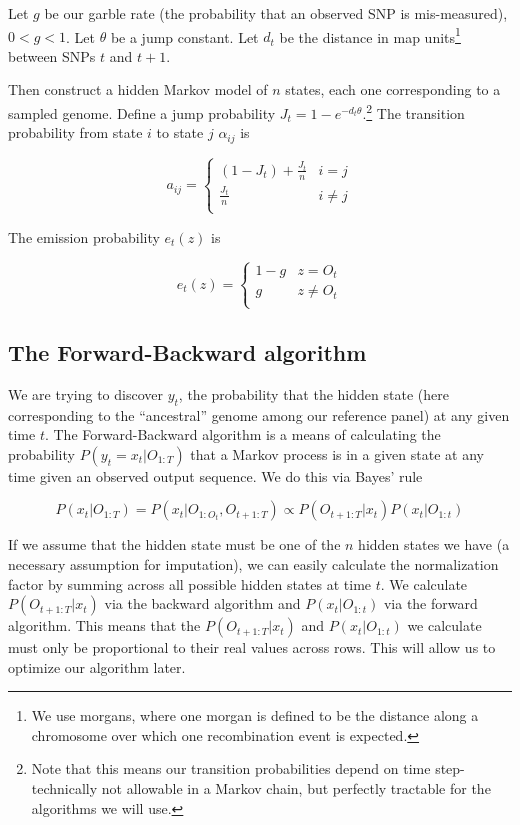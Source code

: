 \documentclass[12pt]{article}
\begin{document}
Let $g$ be our garble rate (the probability that an observed SNP is mis-measured), $0 < g < 1$.  Let $\theta$ be a jump constant.  Let $d_t$ be the distance in map units\footnote{We use morgans, where one morgan is defined to be the distance along a chromosome over which one recombination event is expected.} between SNPs $t$ and $t+1$.

Then construct a hidden Markov model of $n$ states, each one corresponding to a sampled genome.  Define a jump probability $J_t = 1 - e^{-d_t\theta}$.\footnote{Note that this means our transition probabilities depend on time step- technically not allowable in a Markov chain, but perfectly tractable for the algorithms we will use.}  The transition probability from state $i$ to state $j$ $\alpha_{ij}$ is

\[ a_{ij} = \begin{cases} 
      (1 - J_t) + \frac{J_t}{n} & i = j \\
      \frac{J_t}{n} & i \neq j \\
   \end{cases}
\]

The emission probability $e_t(z)$ is

\[ e_t(z) = \begin{cases} 
      1-g & z = O_t \\
      g & z \neq O_t \\
   \end{cases}
\]

\subsection{The Forward-Backward algorithm}

We are trying to discover $y_t$, the probability that the hidden state (here corresponding to the ``ancestral'' genome among our reference panel) at any given time $t$.  The Forward-Backward algorithm is a means of calculating the probability $P(y_t = x_t | O_{1:T})$ that a Markov process is in a given state at any time given an observed output sequence.  We do this via Bayes' rule

$$ P(x_t | O_{1:T}) = P(x_t | O_{1:O_t}, O_{t+1:T}) \propto P(O_{t+1:T} | x_t) P(x_t | O_{1:t}) $$

If we assume that the hidden state must be one of the $n$ hidden states we have (a necessary assumption for imputation), we can easily calculate the normalization factor by summing across all possible hidden states at time $t$.  We calculate $P(O_{t+1:T} | x_t)$ via the backward algorithm and $P(x_t | O_{1:t})$ via the forward algorithm.  This means that the $P(O_{t+1:T} | x_t)$ and $P(x_t | O_{1:t})$ we calculate must only be proportional to their real values across rows.  This will allow us to optimize our algorithm later.
\end{document}
